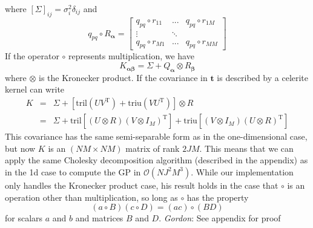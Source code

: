 \documentclass[modern]{aastex62}
\newcommand{\todo}[3]{{\color{#2}\emph{#1}: #3}}
\newcommand{\gordontodo}[1]{\todo{Gordon}{red}{#1}}
\newcommand{\project}[1]{\textsf{#1}}
\newcommand{\celerite}{\project{celerite }}
\newcommand{\bvec}[1]{{\ensuremath{\boldsymbol{#1}}}}
\newcommand{\T}{\ensuremath{\mathrm{T}}}
\begin{document}
	where $[\Sigma]_{ij} = \sigma_i^2\delta_{ij}$ and
	\begin{equation}
		q_{pq}\circ R_\bvec{\alpha} = 
			\begin{bmatrix}
				q_{pq}\circ r_{11} & ... & q_{pq}\circ r_{1M} \\
				\vdots & \ddots & \\
				q_{pq}\circ r_{M1} & ... & q_{pq}\circ r_{MM}
			\end{bmatrix}
	\end{equation}
	If the operator $\circ$ represents multiplication, we have 
	\begin{equation}
		K_\bvec{\alpha\beta} = \Sigma + Q_\bvec{\alpha} \otimes  R_\bvec{\beta}
	\end{equation}
	where $\otimes$ is the Kronecker product. If the covariance in $\bvec{t}$ is described by a \celerite kernel can write 
	\begin{eqnarray}
		K &=& \Sigma + \left[\mathrm{tril}(UV^\T) + \mathrm{triu}(VU^\T)\right]\otimes R \\
		&=& \Sigma + \mathrm{tril}\left[ (U\otimes R)(V\otimes I_M)^\T\right] + \mathrm{triu}\left[ (V\otimes I_M)(U\otimes R)^\T\right]
	\end{eqnarray}
	This covariance has the same semi-separable form as in the one-dimensional case, but now $K$ is an $(NM\times NM)$ matrix of rank $2JM$. 
	This means that we can apply the same Cholesky decomposition algorithm (described in the appendix) as in the 1d case to compute the GP in 
	$\mathcal{O}(NJ^2M^3)$. While our implementation only handles the Kronecker product case, 
	his result holds in the case that $\circ$ is an operation other than multiplication, so long as $\circ$ has the property
	\begin{equation}
		(a\circ B)(c\circ D) = (ac)\circ(BD)
	\end{equation}
	for scalars $a$ and $b$ and matrices $B$ and $D$. 
	\gordontodo{See appendix for proof}
	
\end{document}
